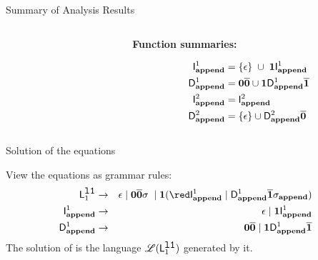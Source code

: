 \begin{frame}[t]{Summary of Analysis Results}
\begin{columns}[c]
\begin{column}[T]{0.33\textwidth}
\end{column}
\begin{column}[T]{0.33\textwidth}
\vspace*{1.5cm}
\centerline{\bf Function summaries:}
{\red
\begin{align*}
        \mathsf{I}_{\mathit {\mathbf{append}}}^{1} &= \{\epsilon\}\;  \cup\;
      \mathbf{1}\mathsf{I}_{\mathit {\mathbf{append}}}^{1}\\
  \mathsf{D}_{\mathit {\mathbf{append}}}^{1} &= \mathbf{0}\overline{\mathbf{0}}\cup\mathbf{1} \mathsf{D}_{\mathit {\mathbf{append}}}^{1}\overline{\mathbf{1}}\\
  \mathsf{I}_{\mathit {\mathbf{append}}}^{2} &= \mathsf{I}_{\mathit {\mathbf{append}}}^{2}\\
  \mathsf{D}_{\mathit {\mathbf{append}}}^{2} &= \{\epsilon\} \cup \mathsf{D}_{\mathit {\mathbf{append}}}^{2}\overline{\mathbf{0}}
  \end{align*}}
  \end{column}
\end{columns}
\end{frame}

\begin{frame}{Solution of the equations}

  View the equations as grammar rules:
\begin{eqnarray*}
    \Lanv{1}{\lista} &\rightarrow& \epsilon \mid  \acar\bcar\sigma\; \mid 
    \acdr({\red \Uf{\append}{1} \mid \Df{\append}{1}\bcdr\sigma_{\append}})\\
  \Uf{\append}{1}    &\rightarrow&    \epsilon   \mid
   \acdr{\Uf{\append}{1}}\\         
   \Df{\append}{1}
   &\rightarrow&               \acar\bcar               \mid
   \acdr\Df{\append}{1}\bcdr\\
 \end{eqnarray*}
The  solution of  is the   language  $\mathscr{L}(\mathsf{L}_{{1}}^{\mbox{\tt l1}})$ generated    by    it.
\end{frame}



